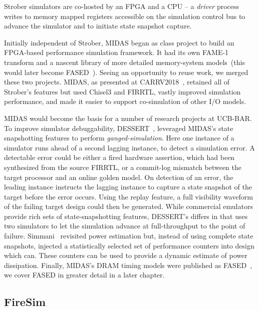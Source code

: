 Strober simulators are co-hosted by an FPGA and a CPU -- a \emph{driver}
process writes to memory mapped registers accessible on the simulation control
bus to advance the simulator and to initiate state snapshot capture.

Initially independent of Strober, MIDAS began as class project to build an
FPGA-based performance simulation framework. It had its own FAME-1 transform
and a nascent library of more detailed memory-system models~(this would later
become FASED~\cite{FASED}).  Seeing an opportunity to reuse work, we merged
these two projects. MIDAS, as presented at CARRV2018~\cite{MIDAS}, retained all
of Strober's features but used Chisel3 and FIRRTL, vastly improved simulation
performance, and made it easier to support co-simulation of other I/O models.

MIDAS would become the basis for a number of research projects at UCB-BAR. To improve simulator debuggability, DESSERT~\cite{DESSERT},
leveraged MIDAS's state snapshotting features to perform
\emph{ganged-simulation}. Here one instance of a simulator runs ahead of a second lagging instance, to
detect a simulation error. A detectable error could be either a fired hardware assertion, which had been synthesized from the source FIRRTL, or a
commit-log mismatch between the target processor and an online golden model.
On detection of an error, the leading instance instructs the lagging instance to capture a
state snapshot of the target before the error occurs.  Using the replay feature, a
full visibility waveform of the failing target design could then be generated. While
commercial emulators provide rich sets of state-snapshotting features,
DESSERT's differs in that uses two simulators to let the simulation advance at
full-throughput to the point of failure. Simmani~\cite{Simmani} revisited power
estimation but, instead of using complete state snapshots, injected
a statistically selected set of performance counters into design which can. These counters
can be used to provide a dynamic estimate of power dissipation. Finally,
MIDAS's DRAM timing models were published as FASED~\cite{FASED}, we cover FASED
in greater detail in a later chapter.

\subsection{FireSim}

